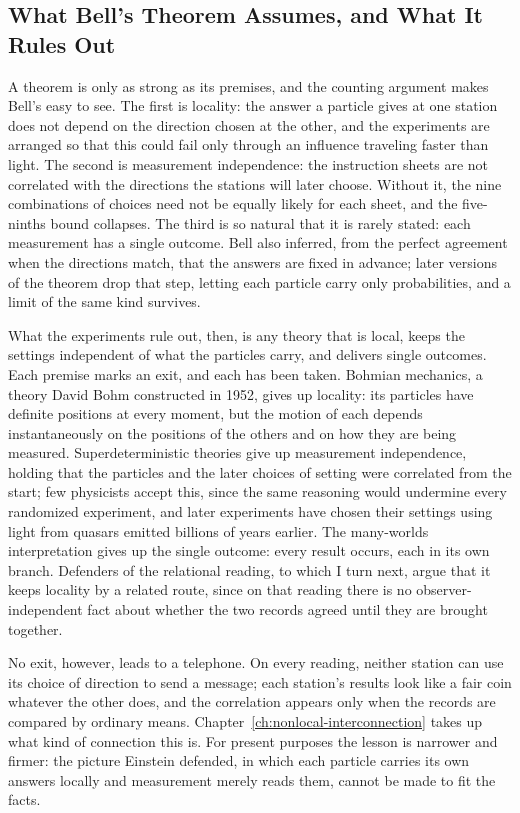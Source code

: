 \subsection*{What Bell's Theorem Assumes, and What It Rules Out}

A theorem is only as strong as its premises, and the counting argument makes Bell's easy to see. The first is locality: the answer a particle gives at one station does not depend on the direction chosen at the other, and the experiments are arranged so that this could fail only through an influence traveling faster than light. The second is measurement independence: the instruction sheets are not correlated with the directions the stations will later choose. Without it, the nine combinations of choices need not be equally likely for each sheet, and the five-ninths bound collapses. The third is so natural that it is rarely stated: each measurement has a single outcome. Bell also inferred, from the perfect agreement when the directions match, that the answers are fixed in advance; later versions of the theorem drop that step, letting each particle carry only probabilities, and a limit of the same kind survives.

What the experiments rule out, then, is any theory that is local, keeps the settings independent of what the particles carry, and delivers single outcomes. Each premise marks an exit, and each has been taken. Bohmian mechanics, a theory David Bohm constructed in 1952, gives up locality: its particles have definite positions at every moment, but the motion of each depends instantaneously on the positions of the others and on how they are being measured. Superdeterministic theories give up measurement independence, holding that the particles and the later choices of setting were correlated from the start; few physicists accept this, since the same reasoning would undermine every randomized experiment, and later experiments have chosen their settings using light from quasars emitted billions of years earlier. The many-worlds interpretation gives up the single outcome: every result occurs, each in its own branch. Defenders of the relational reading, to which I turn next, argue that it keeps locality by a related route, since on that reading there is no observer-independent fact about whether the two records agreed until they are brought together.

No exit, however, leads to a telephone. On every reading, neither station can use its choice of direction to send a message; each station's results look like a fair coin whatever the other does, and the correlation appears only when the records are compared by ordinary means. Chapter~\ref{ch:nonlocal-interconnection} takes up what kind of connection this is. For present purposes the lesson is narrower and firmer: the picture Einstein defended, in which each particle carries its own answers locally and measurement merely reads them, cannot be made to fit the facts.


